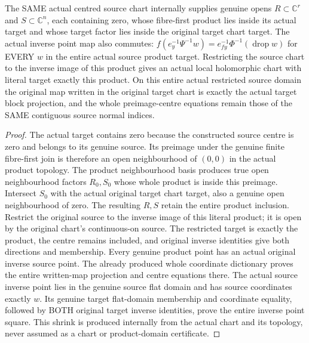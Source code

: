\begin{theorem}
\label{hir:submersion-adapted-actual-product-shrink}
\leanok
{}

The SAME actual centred source chart internally supplies genuine opens $R\subset\mathbb C^r$ and $S\subset\mathbb C^n$, each containing zero, whose fibre-first product lies inside its actual target and whose target factor lies inside the original target chart target. The actual inverse point map also commutes: $f(e_y^{-1}\Psi^{-1}w)=e_{fy}^{-1}\Phi^{-1}(\operatorname{drop}w)$ for EVERY $w$ in the entire actual source product target. Restricting the source chart to the inverse image of this product gives an actual local holomorphic chart with literal target exactly this product. On this entire actual restricted source domain the original map written in the original target chart is exactly the actual target block projection, and the whole preimage-centre equations remain those of the SAME contiguous source normal indices.
\end{theorem}
\begin{proof}
The actual target contains zero because the constructed source centre is zero and belongs to its genuine source. Its preimage under the genuine finite fibre-first join is therefore an open neighbourhood of $(0,0)$ in the actual product topology. The product neighbourhood basis produces true open neighbourhood factors $R_0,S_0$ whose whole product is inside this preimage. Intersect $S_0$ with the actual original target chart target, also a genuine open neighbourhood of zero. The resulting $R,S$ retain the entire product inclusion. Restrict the original source to the inverse image of this literal product; it is open by the original chart's continuous-on source. The restricted target is exactly the product, the centre remains included, and original inverse identities give both directions and membership. Every genuine product point has an actual original inverse source point. The already produced whole coordinate dictionary proves the entire written-map projection and centre equations there. The actual source inverse point lies in the genuine source flat domain and has source coordinates exactly $w$. Its genuine target flat-domain membership and coordinate equality, followed by BOTH original target inverse identities, prove the entire inverse point square. This shrink is produced internally from the actual chart and its topology, never assumed as a chart or product-domain certificate.
\end{proof}

